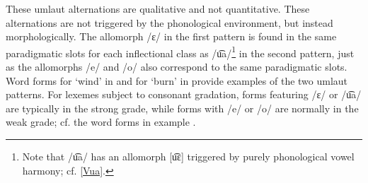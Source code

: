 These umlaut alternations are qualitative and not quantitative. %
These alternations are not triggered by the phonological environment, but instead morphologically. 
The allomorph /ɛ/ in the first pattern is found in the same paradigmatic slots for each inflectional class as /u͡a/\footnote{Note that /u͡a/ has an allomorph [u͡ɛ] triggered by purely phonological vowel harmony; cf. \SEC\ref{Vua}.} 
in the second pattern, just as the allomorphs /e/ and /o/ also correspond to the same paradigmatic slots. 
Word forms for  ‘wind’ in  and for  ‘burn’ in  provide examples of the two umlaut patterns.
\ea\label{umlautEx1}%
\z
%
\ea\label{umlautEx2}%
\Tn{\begin{tabular}{c c}
/p\Bf{u͡a}lːta/		&/p\Bf{o}lta/\\
\It{buallda}		&\It{buolda}\\
ignite\BS\Sc{3sg.prs}	&ignite\BS\Sc{2sg.prs}\\
\end{tabular}
\hfill\hyperlink{pit101208}{{\small [pit101208]}}}
\z
For lexemes subject to consonant gradation, forms featuring /ɛ/ or /u͡a/ are typically in the strong grade, while forms with /e/ or /o/ are normally in the weak grade; cf. the word forms in example . 


